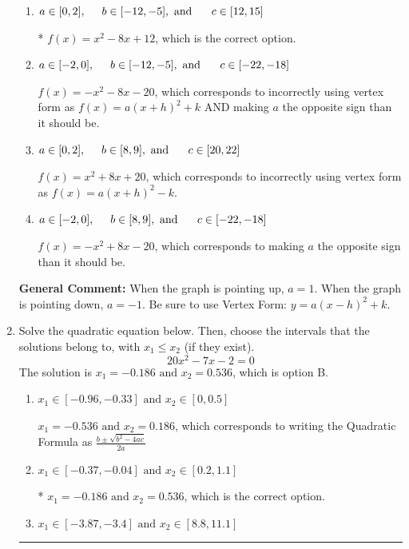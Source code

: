 \documentclass{extbook}[14pt]
\newcommand{\litem}[1]{\item #1

\rule{\textwidth}{0.4pt}}
\begin{document}
\begin{enumerate}
{\begin{enumerate}[label=\Alph*.]
$f(x)=x^{2} +8 x + 12$, which corresponds to incorrectly using vertex form as $f(x) = a(x+h)^2+k$.
\item \( a \in [0, 2], \hspace*{5mm} b \in [-12, -5], \text{ and } \hspace*{5mm} c \in [12, 15] \)

* $f(x)=x^{2} -8 x + 12$, which is the correct option.
\item \( a \in [-2, 0], \hspace*{5mm} b \in [-12, -5], \text{ and } \hspace*{5mm} c \in [-22, -18] \)

$f(x)=-x^{2} -8 x -20$, which corresponds to incorrectly using vertex form as $f(x) = a(x+h)^2+k$ AND making $a$ the opposite sign than it should be.
\item \( a \in [0, 2], \hspace*{5mm} b \in [8, 9], \text{ and } \hspace*{5mm} c \in [20, 22] \)

$f(x)=x^{2} +8 x + 20$, which corresponds to incorrectly using vertex form as $f(x) = a(x+h)^2 - k$.
\item \( a \in [-2, 0], \hspace*{5mm} b \in [8, 9], \text{ and } \hspace*{5mm} c \in [-22, -18] \)

$f(x)=-x^{2} +8 x -20$, which corresponds to making $a$ the opposite sign than it should be.
\end{enumerate}

\textbf{General Comment:} When the graph is pointing up, $a=1$. When the graph is pointing down, $a=-1$. Be sure to use Vertex Form: $y = a(x-h)^2+k$.
}
\litem{
Solve the quadratic equation below. Then, choose the intervals that the solutions belong to, with $x_1 \leq x_2$ (if they exist).
\[ 20x^{2} -7 x -2 = 0 \]The solution is \( x_1 = -0.186 \text{ and } x_2 = 0.536 \), which is option B.\begin{enumerate}[label=\Alph*.]
\item \( x_1 \in [-0.96, -0.33] \text{ and } x_2 \in [0, 0.5] \)

 $x_1 = -0.536 \text{ and } x_2 = 0.186$, which corresponds to writing the Quadratic Formula as $\frac{b \pm \sqrt{b^2 - 4ac}}{2a}$
\item \( x_1 \in [-0.37, -0.04] \text{ and } x_2 \in [0.2, 1.1] \)

* $x_1 = -0.186 \text{ and } x_2 = 0.536$, which is the correct option.
\item \( x_1 \in [-3.87, -3.4] \text{ and } x_2 \in [8.8, 11.1] \)


\end{enumerate}}
\end{enumerate}
\end{document}
